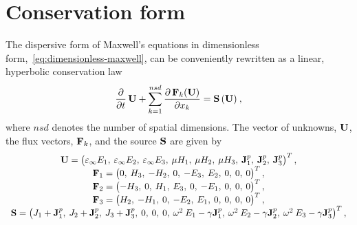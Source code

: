 \section{Conservation form}
\label{sec:conservation-form}
The dispersive form of Maxwell's equations in dimensionless
form,~\eqref{eq:dimensionless-maxwell}, can be conveniently rewritten as a
linear, hyperbolic conservation law\cite{Godlewski:2013tj,LeVeque:2002vc}
\begin{equation}
  \frac{\partial}{\partial t}  \, \mathbf{U} + \sum_{k=1}^{nsd} \frac { \partial \, \mathbf{F}_k(\mathbf{U}) }{ \partial x_k } = \mathbf{S}\,(\mathbf{U}) \: ,
  \label{eq:maxwell-curl-equations-conservation-form}
\end{equation}
where $nsd$ denotes the number of spatial dimensions. The vector of unknowns,
$\mathbf{U}$, the flux vectors, $\mathbf{F}_k$, and the source $\mathbf{S}$ are
given by
\begin{equation*}
  \begin{array}{c}
    \mathbf{U} =
    \begin{pmatrix}
      \varepsilon_{\infty} E_1, \: \varepsilon_{\infty} E_2 , \: \varepsilon_{\infty} E_3 , \: \mu
      H_1 , \: \mu H_2 , \: \mu H_3 , \: \mathbf{J}^p_1 , \: \mathbf{J}^p_2 , \: \mathbf{J}^p_3
    \end{pmatrix}^T,
    \\
    \mathbf{F}_1 =
    \begin{pmatrix}
      0 ,\: H_3 ,\: -H_2 ,\: 0 ,\: -E_3 ,\: E_2 ,\: 0 ,\: 0 ,\: 0
    \end{pmatrix}^T , \\

    \mathbf{F}_2 =
    \begin{pmatrix}
      - H_3 ,\: 0 ,\: H_1 ,\: E_3 ,\: 0 ,\: -E_1 ,\: 0 ,\: 0 ,\: 0
    \end{pmatrix}^T , \\

    \mathbf{F}_3 =
    \begin{pmatrix}
      H_2 ,\: -H_1 ,\: 0 ,\: -E_2 ,\: E_1 ,\: 0 ,\: 0 ,\: 0 ,\: 0
    \end{pmatrix}^T , \\

    \mathbf{S} =
    \begin{pmatrix}
      J_1 + \mathbf{J}^p_1 ,\: J_2 + \mathbf{J}^p_2 ,\: J_3 + \mathbf{J}^p_3 ,\: 0 ,\: 0 ,\: 0 ,\: \omega^2
      \: E_1 - \gamma \mathbf{J}^p_1 ,\: \omega^2 \: E_2 - \gamma \mathbf{J}^p_2 ,\: \omega^2 \:
      E_3 - \gamma \mathbf{J}^p_3
    \end{pmatrix}^T,

  \end{array}
\end{equation*}
